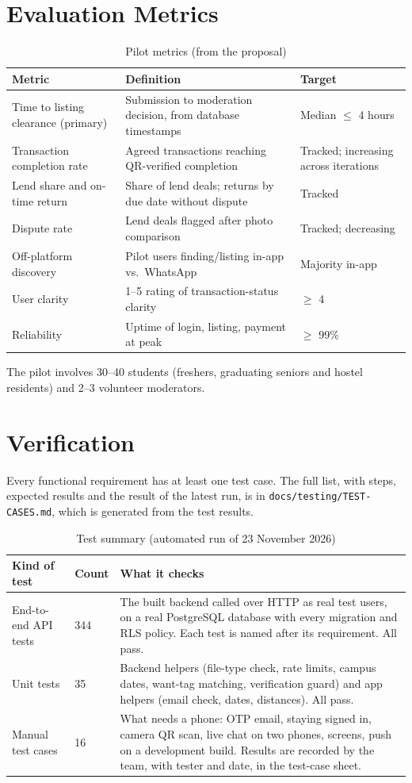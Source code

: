 \documentclass[11pt,a4paper]{scrreprt}
\begin{document}
\section{Evaluation Metrics}
\begin{longtable}{L{4.2cm} L{6.6cm} L{3.9cm}}
\caption{Pilot metrics (from the proposal)}\label{tab:metrics}\\
\toprule
\textbf{Metric} & \textbf{Definition} & \textbf{Target}\\ \midrule\endhead
Time to listing clearance (primary) & Submission to moderation decision, from database timestamps & Median $\leq$ 4 hours\\
Transaction completion rate & Agreed transactions reaching QR-verified completion & Tracked; increasing across iterations\\
Lend share and on-time return & Share of lend deals; returns by due date without dispute & Tracked\\
Dispute rate & Lend deals flagged after photo comparison & Tracked; decreasing\\
Off-platform discovery & Pilot users finding/listing in-app vs.\ WhatsApp & Majority in-app\\
User clarity & 1--5 rating of transaction-status clarity & $\geq$ 4\\
Reliability & Uptime of login, listing, payment at peak & $\geq$ 99\%\\
\bottomrule
\end{longtable}
The pilot involves 30--40 students (freshers, graduating seniors and hostel
residents) and 2--3 volunteer moderators.

\section{Verification}\label{sec:verification}
Every functional requirement has at least one test case. The full list, with
steps, expected results and the result of the latest run, is in
\texttt{docs/testing/TEST-CASES.md}, which is generated from the test results.

\begin{longtable}{L{4.2cm} L{1.5cm} L{8.9cm}}
\caption{Test summary (automated run of 23 November 2026)}\label{tab:tests}\\
\toprule
\textbf{Kind of test} & \textbf{Count} & \textbf{What it checks}\\ \midrule\endhead
End-to-end API tests & 344 & The built backend called over HTTP as real test users, on a real PostgreSQL database with every migration and RLS policy. Each test is named after its requirement. All pass.\\
Unit tests & 35 & Backend helpers (file-type check, rate limits, campus dates, want-tag matching, verification guard) and app helpers (email check, dates, distances). All pass.\\
Manual test cases & 16 & What needs a phone: OTP email, staying signed in, camera QR scan, live chat on two phones, screens, push on a development build. Results are recorded by the team, with tester and date, in the test-case sheet.\\
\bottomrule
\end{longtable}
\end{document}
